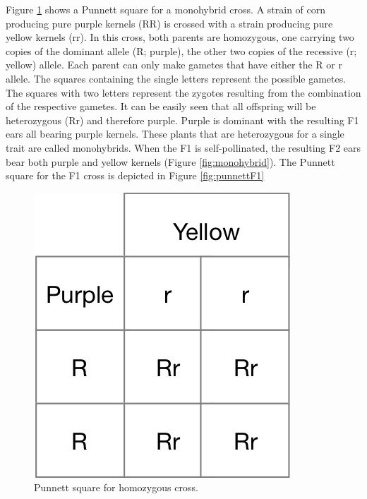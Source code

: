 Figure \ref{fig:punnett} shows a Punnett square for a monohybrid cross. A strain of corn producing pure purple kernels (RR) is crossed with a strain producing pure yellow kernels (rr). In this cross, both parents are homozygous, one carrying two copies of the dominant allele (R; purple), the other two copies of the recessive (r; yellow) allele. Each parent can only make gametes that have either the R or r allele. The squares containing the single letters represent the possible gametes. The squares with two letters represent the zygotes resulting from the combination of the respective gametes. It can be easily seen that all offspring will be heterozygous (Rr) and therefore purple. Purple is dominant with the resulting F1 ears all bearing purple kernels. These plants that are heterozygous for a single trait are called monohybrids. When the F1 is self-pollinated, the resulting F2 ears bear both purple and yellow kernels (Figure \ref{fig:monohybrid}). The Punnett square for the F1 cross is depicted in Figure \ref{fig:punnettF1}

\begin{figure}

{\centering \includegraphics[width=0.7\linewidth]{./figures/mendel/Punnett} 

}

\caption{Punnett square for homozygous cross.}\label{fig:punnett}
\end{figure}

